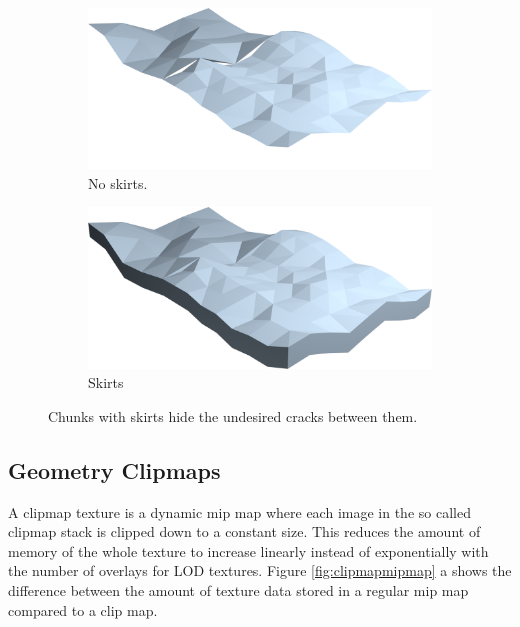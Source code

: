 \begin{figure}[htbp]
    \centering
    \begin{subfigure}[bt]{0.4\textwidth}
        \includegraphics[width=\textwidth]{figures/chunkedlod/skirts_without.png}
        \caption{No skirts.}
    \end{subfigure}
    \begin{subfigure}[bt]{0.4\textwidth}
        \includegraphics[width=\textwidth]{figures/chunkedlod/skirts_with.png}
        \caption{Skirts}
    \end{subfigure}
    \caption{Chunks with skirts hide the undesired cracks between them.}
    \label{fig:skirts}
\end{figure}


\subsection{Geometry Clipmaps}
A clipmap texture is a dynamic mip map where each image in the so called clipmap stack is clipped down to a constant size. This reduces the amount of memory of the whole texture to increase linearly instead of exponentially with the number of overlays for LOD textures. Figure \ref{fig:clipmapmipmap} a shows the difference between the amount of texture data stored in a regular mip map compared to a clip map.

